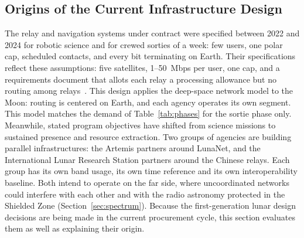 \documentclass{IEEEoj}
\begin{document}
\subsection{Origins of the Current Infrastructure Design}
The relay and navigation systems under contract were specified between 2022 and 2024 for robotic science and for crewed sorties of a week: few users, one polar cap, scheduled contacts, and every bit terminating on Earth. Their specifications reflect these assumptions: five satellites, \SI{1}{}--\SI{50}{Mbps} per user, one cap, and a requirements document that allots each relay a processing allowance but no routing among relays~\cite{nasa_lunar_relay_srd}. This design applies the deep-space network model to the Moon: routing is centered on Earth, and each agency operates its own segment. This model matches the demand of Table~\ref{tab:phases} for the sortie phase only. Meanwhile, stated program objectives have shifted from science missions to sustained presence and resource extraction. Two groups of agencies are building parallel infrastructures: the Artemis partners around LunaNet, and the International Lunar Research Station partners around the Chinese relays. Each group has its own band usage, its own time reference and its own interoperability baseline. Both intend to operate on the far side, where uncoordinated networks could interfere with each other and with the radio astronomy protected in the Shielded Zone (Section~\ref{sec:spectrum}). Because the first-generation lunar design decisions are being made in the current procurement cycle, this section evaluates them as well as explaining their origin.
\end{document}

